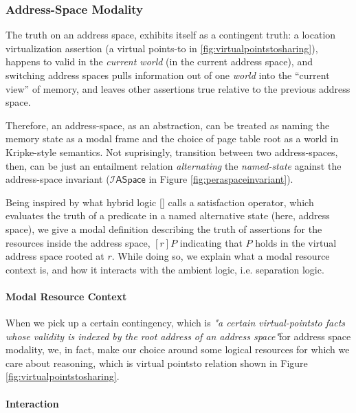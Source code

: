 \subsubsection{Address-Space Modality}
\label{sec:aspacemodalist}

The truth on an address space, exhibits itself as a contingent truth: a location virtualization assertion (a virtual points-to in \ref{fig:virtualpointstosharing}),  happens to valid in the \textit{current world} (in the current address space), and switching address spaces pulls information out of one \textit{world} into the “current view” of memory, and leaves other assertions true relative to the previous address space.

Therefore, an address-space, as an abstraction, can be treated as naming the memory state as a modal frame and the choice of page table root as a world in Kripke-style semantics. Not suprisingly, transition between two address-spaces, then, can be just an entailment relation \textit{alternating} the \textit{named-state} against the address-space invariant ($\mathcal{I}\textsf{ASpace}$ in Figure \ref{fig:peraspaceinvariant}). 

Being inspired by what hybrid logic \ref{} calls a satisfaction operator, which evaluates the truth of a predicate in a named alternative state (here, address space), we give a modal definition describing the truth of assertions for the resources inside the address space, $[r]P$ indicating that $P$ holds in the virtual address space rooted at $r$. While doing so, we explain what a modal resource context is, and how it interacts with the ambient logic, i.e. separation logic.
\paragraph{Modal Resource Context}
\label{sec:resourcecontext}
When we pick up a certain contingency, which is \textit{"a certain virtual-pointsto facts whose validity is indexed by the root address of an address space"}for address space modality, we, in fact, make our choice around some logical resources for which we care about reasoning, which is virtual pointsto relation shown in Figure \ref{fig:virtualpointstosharing}.
\paragraph{Interaction}
\label{sec:interaction}

